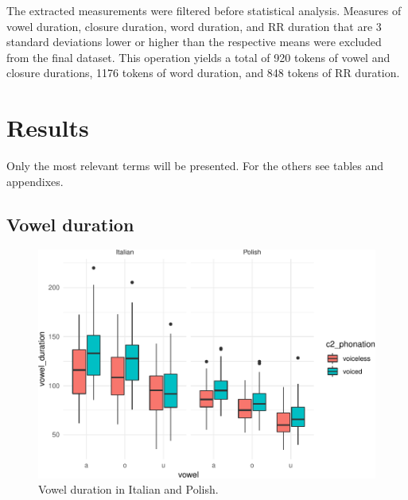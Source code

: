 \documentclass[preprint]{JASAnew}
\begin{document}
The extracted measurements were filtered before statistical analysis.
Measures of vowel duration, closure duration, word duration, and RR
duration that are 3 standard deviations lower or higher than the
respective means were excluded from the final dataset. This operation
yields a total of 920 tokens of vowel and closure durations, 1176 tokens
of word duration, and 848 tokens of RR duration.

\hypertarget{results}{%
\section{Results}\label{results}}

Only the most relevant terms will be presented. For the others see
tables and appendixes.

\hypertarget{vowel-duration}{%
\subsection{Vowel duration}\label{vowel-duration}}

\begin{figure}
\centering
\includegraphics{2018-jasa_files/figure-latex/vowels-plot-1.pdf}
\caption{Vowel duration in Italian and Polish.}
\end{figure}
\end{document}
